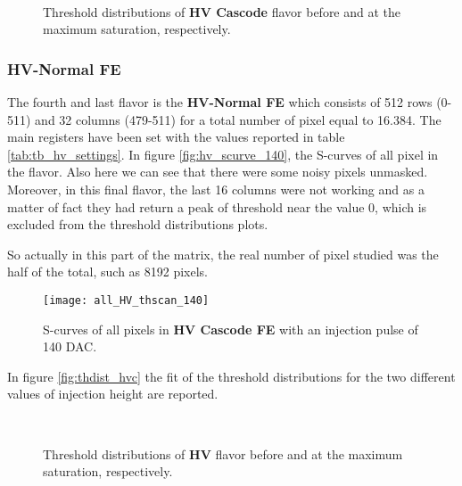 \begin{figure}[h!]
\centering
{}\quad
{}\\
\caption{Threshold distributions of \textbf{HV Cascode} flavor before and at the maximum saturation, respectively.}
\label{fig:thdist_hvc}
\end{figure}


\subsubsection{HV-Normal FE}

The fourth and last flavor is the \textbf{HV-Normal FE} which consists of 512 rows (0-511) and 32 columns (479-511) for a total number of pixel equal to 16.384. The main registers have been set with the values reported in table \vref{tab:tb_hv_settings}.
In figure \vref{fig:hv_scurve_140}, the S-curves of all pixel in the flavor. Also here we can see that there were some noisy pixels unmasked.
Moreover, in this final flavor, the last 16 columns were not working and as a matter of fact they had return a peak of threshold near the value 0, which is excluded from the threshold distributions plots.

So actually in this part of the matrix, the real number of pixel studied was the half of the total, such as 8192 pixels.



\begin{figure}[h!]
\centering
\texttt{[image: all\_HV\_thscan\_140]}
\caption{S-curves of all pixels in \textbf{HV Cascode FE} with an injection pulse of 140 DAC.}
\label{fig:hv_scurve_140}
\end{figure}

In figure \vref{fig:thdist_hvc} the fit of the threshold distributions for the two different values of injection height are reported.


\begin{figure}[h!]
\centering
{}\quad
{}\\
\caption{Threshold distributions of \textbf{HV} flavor before and at the maximum saturation, respectively.}
\label{fig:thdist_hvc}
\end{figure}



